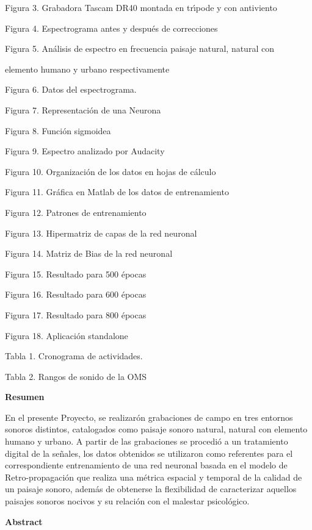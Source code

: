Figura 3. Grabadora Tascam DR40 montada en tr\'{\i}pode y con antiviento

Figura 4. Espectrograma antes y despu\'{e}s de correcciones

Figura 5. An\'{a}lisis de espectro en frecuencia paisaje natural, natural
con

elemento humano y urbano respectivamente

Figura 6. Datos del espectrograma.

Figura 7. Representaci\'{o}n de una Neurona

Figura 8. Funci\'{o}n sigmoidea

Figura 9. Espectro analizado por Audacity

Figura 10. Organizaci\'{o}n de los datos en hojas de c\'{a}lculo

Figura 11. Gr\'{a}fica en Matlab de los datos de entrenamiento

Figura 12. Patrones de entrenamiento

Figura 13. Hipermatriz de capas de la red neuronal

Figura 14. Matriz de Bias de la red neuronal

Figura 15. Resultado para 500 \'{e}pocas

Figura 16. Resultado para 600 \'{e}pocas

Figura 17. Resultado para 800 \'{e}pocas

Figura 18. Aplicaci\'{o}n standalone

Tabla 1. Cronograma de actividades.

Tabla 2. Rangos de sonido de la OMS

\textbf{Resumen }

En el presente Proyecto, se realizar\'{o}n grabaciones de campo en tres
entornos sonoros distintos, catalogados como paisaje sonoro natural, natural
con elemento humano y urbano. A partir de las grabaciones se procedi\'{o} a un
tratamiento digital de la se\~{n}ales, los datos obtenidos se utilizaron como
referentes para el correspondiente entrenamiento de una red neuronal basada en
el modelo de Retro-propagaci\'{o}n que realiza una m\'{e}trica espacial y
temporal de la calidad de un paisaje sonoro, adem\'{a}s de obtenerse la
flexibilidad de caracterizar aquellos paisajes sonoros nocivos y su
relaci\'{o}n con el malestar psicol\'{o}gico.

\textbf{Abstract }

